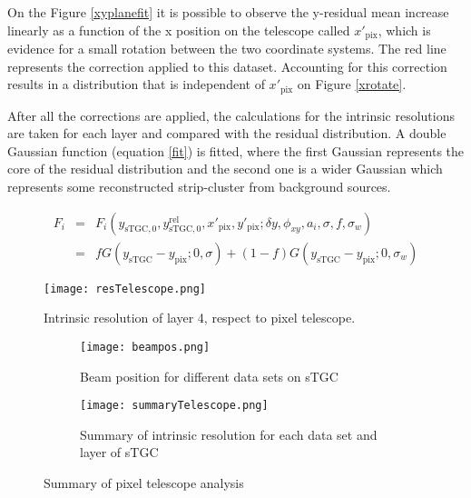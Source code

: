 	On the Figure \ref{xyplanefit} it is possible to observe the y-residual mean increase linearly as a function of the x
	position on the telescope called $x'_{\mathrm{pix}}$, which is evidence for a small rotation between the two
	coordinate systems. The red line represents the correction applied to this dataset. Accounting for this correction
	results in a distribution that is independent of $x'_{\mathrm{pix}}$ on Figure \ref{xrotate}.\par

 After all the corrections are applied, the calculations for the intrinsic resolutions are taken for each layer 
 and compared with  the residual distribution. A double Gaussian function (equation \ref{fit}) is fitted, where the first
 Gaussian represents the core of the residual distribution and the second one is a wider Gaussian which represents some
 reconstructed strip-cluster from background sources. \par
 
 \begin{eqnarray}
	F_i &=& F_i(y_{\mathrm{sTGC},0}, y_{\mathrm{sTGC},0}^{\mathrm{rel}}, x'_{\mathrm{pix}},y'_{\mathrm{pix}};\delta y,\phi_{xy},a_i,\sigma,f,\sigma_w)\\
			&=& f G(y_{\mathrm{sTGC}}-y_{\mathrm{pix}};0,\sigma) +
			(1-f)G(y_{\mathrm{sTGC}}-y_{\mathrm{pix}};0,\sigma_w)\label{fit}
	\end{eqnarray}


\begin{figure}[ht]
	\centering
	\texttt{[image: resTelescope.png]}
	\caption{Intrinsic resolution of layer 4, respect to pixel telescope.}\label{restelescope}
	\end{figure}

	\begin{figure}[ht]
	\centering
		\hspace*{\fill}
	\begin{subfigure}[b]{0.3\textwidth}
	\texttt{[image: beampos.png]}
	\caption{Beam position for different data sets on sTGC}\label{beampos}
	\end{subfigure}
	\hfill
	\begin{subfigure}[b]{0.6\textwidth}
	\centering
	\texttt{[image: summaryTelescope.png]}
	\caption{Summary of intrinsic resolution for each data set and layer of sTGC}\label{summary}
	\end{subfigure}
	\hspace*{\fill}
	\caption{Summary of pixel telescope analysis}\label{}
\end{figure}


